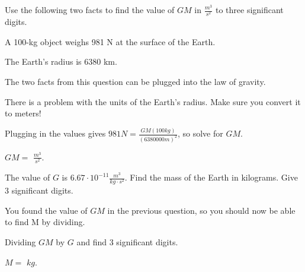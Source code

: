 \documentclass{ximera}
\begin{document}
\begin{question}
Use the following two facts to find the value of $GM$ in $\frac{m^3}{s^2}$ to three significant digits. 
\begin{observation} A 100-kg object weighs 981 N at the surface of the Earth. \end{observation}
\begin{observation} The Earth's radius is 6380 km. \end{observation}

\begin{solution}
\begin{hint}
The two facts from this question can be plugged into the law of gravity.
\end{hint}
\begin{hint}
There is a problem with the units of the Earth's radius. Make sure you convert it to meters!
\end{hint}
\begin{hint}
Plugging in the values gives $981 N = \frac{GM (100 kg)}{(6380000 m)^2}$, so solve for $GM$.
\end{hint}
$GM =$  $\frac{m^3}{s^2}$.
\end{solution}
\end{question}

\begin{question}
The value of $G$ is $6.67 \cdot 10^{-11} \frac{m^3}{kg \cdot s^2}$. Find the mass of the Earth in kilograms. Give 3 significant digits.
\begin{solution}
\begin{hint}
You found the value of $G M$ in the previous question, so you should now be able to find M by dividing.
\end{hint}
\begin{hint}
Dividing $G M$ by $G$ and find 3 significant digits. 
\end{hint}
$M =$  $kg$.
\end{solution}
\end{question}
\end{document}
